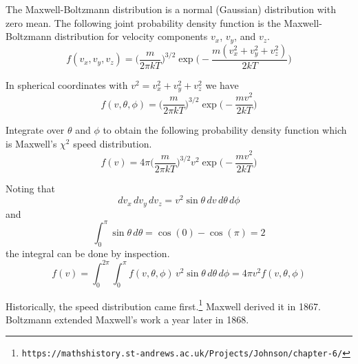 \documentclass[12pt]{article}
\begin{document}
The Maxwell-Boltzmann distribution is a normal (Gaussian) distribution with zero mean.
The following joint probability density function is the Maxwell-Boltzmann
distribution for velocity components $v_x$, $v_y$, and $v_z$.
\begin{equation*}
f(v_x,v_y,v_z)=
\bigg(\frac{m}{2\pi kT}\bigg)^{3/2}
\exp\bigg({-}\frac{m(v_x^2+v_y^2+v_z^2)}{2kT}\bigg)
\end{equation*}

In spherical coordinates with $v^2=v_x^2+v_y^2+v_z^2$ we have
\begin{equation*}
f(v,\theta,\phi)=
\bigg(\frac{m}{2\pi kT}\bigg)^{3/2}
\exp\bigg({-}\frac{mv^2}{2kT}\bigg)
\end{equation*}

Integrate over $\theta$ and $\phi$
to obtain the following probability density function
which is Maxwell's $\chi^2$ speed distribution.
\begin{equation*}
f(v)=4\pi\bigg(\frac{m}{2\pi kT}\bigg)^{3/2}
v^2\exp\bigg({-}\frac{mv^2}{2kT}\bigg)
\end{equation*}

Noting that
\begin{equation*}
dv_x\,dv_y\,dv_z=v^2\sin\theta\,dv\,d\theta\,d\phi
\end{equation*}
and
\begin{equation*}
\int_0^\pi\sin\theta\,d\theta=\cos(0)-\cos(\pi)=2
\end{equation*}
the integral can be done by inspection.
\begin{equation*}
f(v)=\int_0^{2\pi}\int_0^\pi f(v,\theta,\phi)\,v^2\sin\theta\,d\theta\,d\phi
=4\pi v^2f(v,\theta,\phi)
\end{equation*}

Historically, the speed distribution came first.\footnote{\tt https://mathshistory.st-andrews.ac.uk/Projects/Johnson/chapter-6/}
Maxwell derived it in 1867.
Boltzmann extended Maxwell's work a year later in 1868.
\end{document}
